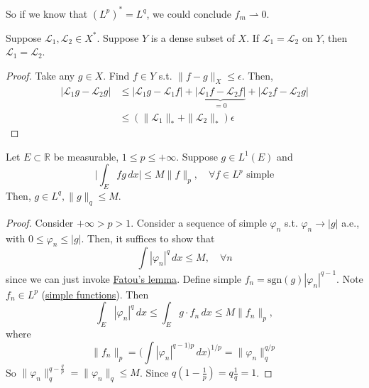   So if we know that $(L^p)^\ast = L^q$, we could conclude $f_m \rightharpoonup 0$. 

  \begin{lemma}
    \label{thm:vanishing-integral-against-simple-functions}
    Suppose $\mathcal{L}_1, \mathcal{L}_2 \in X^\ast$. Suppose $Y$ is a dense subset of $X$. If $\mathcal{L}_1 = \mathcal{L}_2$ on $Y$, then $\mathcal{L}_1 = \mathcal{L}_2$. 
  \end{lemma}
  \begin{proof}
    Take any $g \in X$. Find $f \in Y$ s.t. $\|f - g\|_X \leq \epsilon$. Then, 
    \begin{align}
      |\mathcal{L}_1 g - \mathcal{L}_2 g| 
        & \leq |\mathcal{L}_1 g - \mathcal{L}_1 f| + \underbrace{|\mathcal{L}_1 f - \mathcal{L}_2 f|}_{=0} + |\mathcal{L}_2 f - \mathcal{L}_2 g| \\ 
        & \leq (\|\mathcal{L}_1\|_\ast + \| \mathcal{L}_2\|_\ast) \epsilon
    \end{align}
  \end{proof}

  \begin{lemma}
    \label{thm:riesz-representation-on-a-finite-interval}
 
    Let $E \subset \mathbb{R}$ be measurable, $1 \leq p \leq +\infty$. Suppose $g \in L^1 (E)$ and 
    \begin{equation}
      \bigg| \int_E f g \,dx \bigg| \leq M \| f\|_p, \quad \forall f \in L^p \text{ simple}
    \end{equation}
    Then, $g \in L^q, \|g\|_q \leq M$. 
  \end{lemma}
  \begin{proof}
    Consider $+\infty > p > 1$. Consider a sequence of simple $\varphi_n$ s.t. $\varphi_n \to |g|$ a.e., with $0 \leq \varphi_n \leq |g|$. Then, it suffices to show that 
    \begin{equation}
      \int | \varphi_n|^q \,dx \leq M, \quad \forall n
    \end{equation}
    since we can just invoke \hyperref[thm:fatous-lemma]{Fatou's lemma}. Define simple $f_n = \mathrm{sgn}(g) |\varphi_n|^{q-1}$. Note $f_n \in L^p$ (\hyperref[def:simple-functions]{simple functions}). Then 
    \begin{equation}
      \int_E |\varphi_n|^q\,dx \leq  \int_E g \cdot f_n \,dx \leq M \|f_n \|_p, 
    \end{equation}
    where 
    \begin{equation}
      \|f_n\|_p = \bigg( \int | \varphi_n|^{q-1)p} \,dx \bigg)^{1/p} = \| \varphi_n \|_q^{q/p} 
    \end{equation}
    So $\| \varphi_n \|_q^{q- \frac{q}{p}} = \|\varphi_n\|_q \leq M$. Since $q(1 - \frac{1}{p}) = q \frac{1}{q} = 1$. 
  \end{proof}

